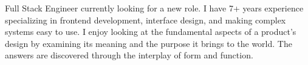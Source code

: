 

\begin{cvparagraph}

Full Stack Engineer currently looking for a new role. I have 7+ years experience specializing in frontend development, interface design, and making complex systems easy to use. I enjoy looking at the fundamental aspects of a product's design by examining its meaning and the purpose it brings to the world. The answers are discovered through the interplay of form and function.
\end{cvparagraph}
